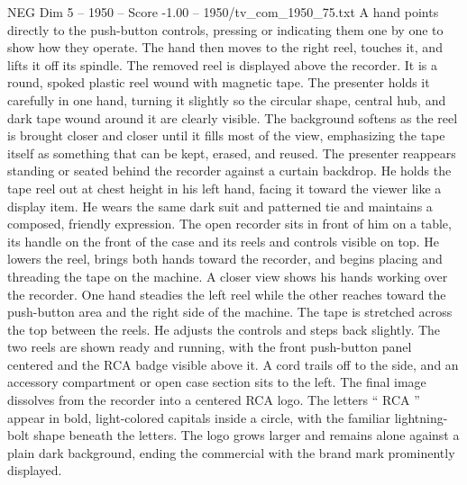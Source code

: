 \begin{textsample}{NEG Dim 5 – 1950 – Score -1.00 – 1950/tv\_com\_1950\_75.txt}
A hand points directly to the push-button controls, pressing or indicating them one by one to show how they operate.
The hand then moves to the right reel, touches it, and lifts it off its spindle.
The removed reel is displayed above the recorder.
It is a round, spoked plastic reel wound with magnetic tape.
The presenter holds it carefully in one hand, turning it slightly so the circular shape, central hub, and dark tape wound around it are clearly visible.
The background softens as the reel is brought closer and closer until it fills most of the view, emphasizing the tape itself as something that can be kept, erased, and reused.
The presenter reappears standing or seated behind the recorder against a curtain backdrop.
He holds the tape reel out at chest height in his left hand, facing it toward the viewer like a display item.
He wears the same dark suit and patterned tie and maintains a composed, friendly expression.
The open recorder sits in front of him on a table, its handle on the front of the case and its reels and controls visible on top.
He lowers the reel, brings both hands toward the recorder, and begins placing and threading the tape on the machine.
A closer view shows his hands working over the recorder.
One hand steadies the left reel while the other reaches toward the push-button area and the right side of the machine.
The tape is stretched across the top between the reels.
He adjusts the controls and steps back slightly.
The two reels are shown ready and running, with the front push-button panel centered and the RCA badge visible above it.
A cord trails off to the side, and an accessory compartment or open case section sits to the left.
The final image dissolves from the recorder into a centered RCA logo.
The letters “ RCA ” appear in bold, light-colored capitals inside a circle, with the familiar lightning-bolt shape beneath the letters.
The logo grows larger and remains alone against a plain dark background, ending the commercial with the brand mark prominently displayed.

\end{textsample}
